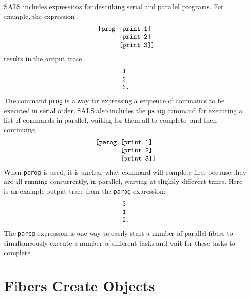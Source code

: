 SALS includes expressions for describing serial and parallel
programs.  For example, the expression
\begin{equation*}
\begin{array}{l}
\text{\tt [prog [print 1]} \\
\text{\tt ~~~~~~[print 2]} \\
\text{\tt ~~~~~~[print 3]]}
\end{array}
\end{equation*}
results in the output trace
\begin{equation*}
\begin{array}{l}
\text{\tt 1} \\
\text{\tt 2} \\
\text{\tt 3.}
\end{array}
\end{equation*}
The command {\tt prog} is a way for expressing a sequence of commands
to be executed in serial order.  SALS also includes the {\tt parog}
command for executing a list of commands in parallel, waiting for them
all to complete, and then continuing.
\begin{equation*}
\begin{array}{l}
\text{\tt [parog [print 1]} \\
\text{\tt ~~~~~~~[print 2]} \\
\text{\tt ~~~~~~~[print 3]]}
\end{array}
\end{equation*}
When {\tt parog} is used, it is unclear what command will complete
first because they are all running concurrently, in parallel, starting
at slightly different times.  Here is an example output trace from the
{\tt parog} expression:
\begin{equation*}
\begin{array}{l}
\text{\tt 3} \\
\text{\tt 1} \\
\text{\tt 2.}
\end{array}
\end{equation*}
The {\tt parog} expression is one way to easily start a number of
parallel fibers to simultaneously execute a number of different tasks
and wait for these tasks to complete.

\section{Fibers Create Objects}

